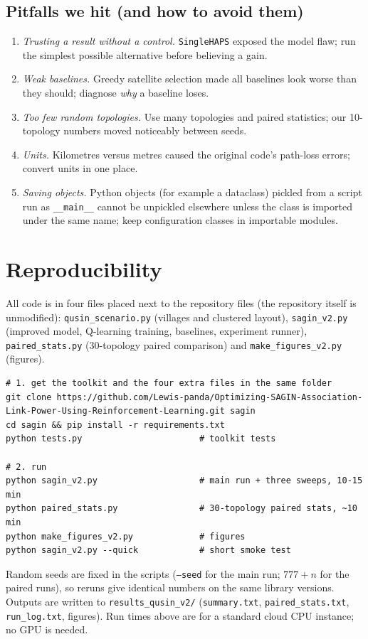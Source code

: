\documentclass[11pt,a4paper]{article}
\begin{document}
\subsection{Pitfalls we hit (and how to avoid them)}
\begin{enumerate}
  \item \emph{Trusting a result without a control.} \texttt{SingleHAPS} exposed the model flaw; run the simplest possible alternative before believing a gain.
  \item \emph{Weak baselines.} Greedy satellite selection made all baselines look worse than they should; diagnose \emph{why} a baseline loses.
  \item \emph{Too few random topologies.} Use many topologies and paired statistics; our 10-topology numbers moved noticeably between seeds.
  \item \emph{Units.} Kilometres versus metres caused the original code's path-loss errors; convert units in one place.
  \item \emph{Saving objects.} Python objects (for example a dataclass) pickled from a script run as \texttt{\_\_main\_\_} cannot be unpickled elsewhere unless the class is imported under the same name; keep configuration classes in importable modules.
\end{enumerate}

\section{Reproducibility}
\label{sec:repro}

All code is in four files placed next to the repository files (the repository itself is unmodified): \texttt{qusin\_scenario.py} (villages and clustered layout), \texttt{sagin\_v2.py} (improved model, Q-learning training, baselines, experiment runner), \texttt{paired\_stats.py} (30-topology paired comparison) and \texttt{make\_figures\_v2.py} (figures).
\begin{lstlisting}
# 1. get the toolkit and the four extra files in the same folder
git clone https://github.com/Lewis-panda/Optimizing-SAGIN-Association-Link-Power-Using-Reinforcement-Learning.git sagin
cd sagin && pip install -r requirements.txt
python tests.py                       # toolkit tests

# 2. run
python sagin_v2.py                    # main run + three sweeps, 10-15 min
python paired_stats.py                # 30-topology paired stats, ~10 min
python make_figures_v2.py             # figures
python sagin_v2.py --quick            # short smoke test
\end{lstlisting}
Random seeds are fixed in the scripts (\texttt{--seed} for the main run; $777+n$ for the paired runs), so reruns give identical numbers on the same library versions. Outputs are written to \texttt{results\_qusin\_v2/} (\texttt{summary.txt}, \texttt{paired\_stats.txt}, \texttt{run\_log.txt}, figures). Run times above are for a standard cloud CPU instance; no GPU is needed.
\end{document}

